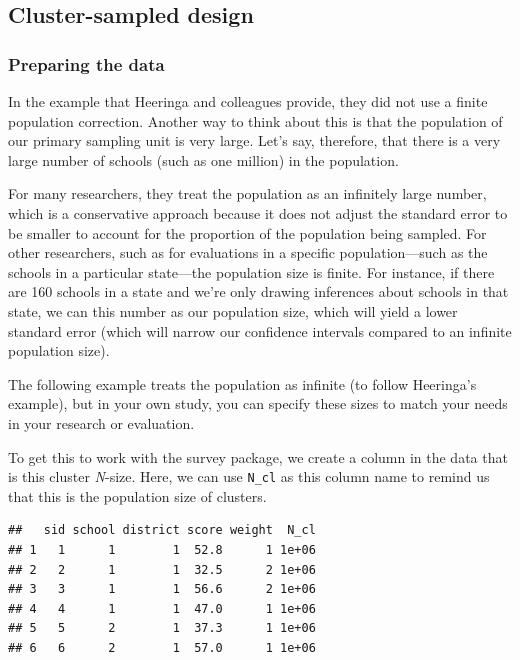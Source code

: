 \documentclass[
]{article}
\newenvironment{Shaded}{\begin{snugshade}}{\end{snugshade}}
\newcommand{\DecValTok}[1]{\textcolor[rgb]{0.00,0.00,0.81}{#1}}
\newcommand{\KeywordTok}[1]{\textcolor[rgb]{0.13,0.29,0.53}{\textbf{#1}}}
\newcommand{\NormalTok}[1]{#1}
\newcommand{\OperatorTok}[1]{\textcolor[rgb]{0.81,0.36,0.00}{\textbf{#1}}}
\newcommand{\StringTok}[1]{\textcolor[rgb]{0.31,0.60,0.02}{#1}}
\begin{document}
\hypertarget{cluster-sampled-design}{%
\subsection{Cluster-sampled design}\label{cluster-sampled-design}}

\hypertarget{preparing-the-data}{%
\subsubsection{Preparing the data}\label{preparing-the-data}}

In the example that Heeringa and colleagues provide, they did not use a finite population correction. Another way to think about this is that the population of our primary sampling unit is very large. Let's say, therefore, that there is a very large number of schools (such as one million) in the population.

For many researchers, they treat the population as an infinitely large number, which is a conservative approach because it does not adjust the standard error to be smaller to account for the proportion of the population being sampled. For other researchers, such as for evaluations in a specific population---such as the schools in a particular state---the population size is finite. For instance, if there are 160 schools in a state and we're only drawing inferences about schools in that state, we can this number as our population size, which will yield a lower standard error (which will narrow our confidence intervals compared to an infinite population size).

The following example treats the population as infinite (to follow Heeringa's example), but in your own study, you can specify these sizes to match your needs in your research or evaluation.

To get this to work with the survey package, we create a column in the data that is this cluster \emph{N}-size. Here, we can use \texttt{N\_cl} as this column name to remind us that this is the population size of clusters.

\begin{Shaded}
\end{Shaded}

\begin{verbatim}
##   sid school district score weight  N_cl
## 1   1      1        1  52.8      1 1e+06
## 2   2      1        1  32.5      2 1e+06
## 3   3      1        1  56.6      2 1e+06
## 4   4      1        1  47.0      1 1e+06
## 5   5      2        1  37.3      1 1e+06
## 6   6      2        1  57.0      1 1e+06
\end{verbatim}
\end{document}
